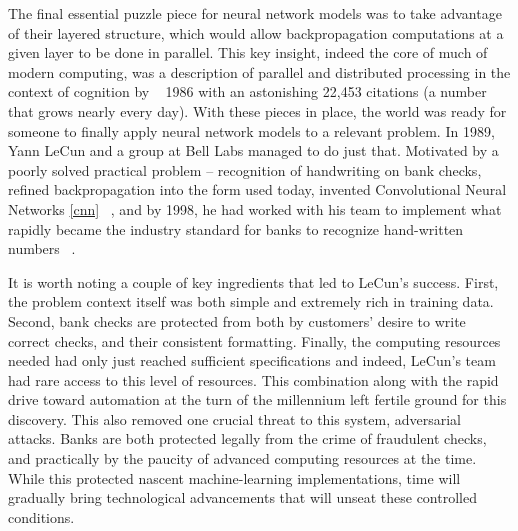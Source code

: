 The final essential puzzle piece for neural network models was to take
advantage of their layered structure, which would allow
backpropagation computations at a given layer to be done in
parallel. This key insight, indeed the core of much of modern
computing, was a description of parallel and distributed processing in
the context of cognition by 
~\citet{mcclelland1986parallel} 1986 with an astonishing 22,453 citations (a
number that grows nearly every day). With these pieces in place, the
world was ready for someone to finally apply neural network models to
a relevant problem. In 1989, Yann LeCun and a group at Bell Labs
managed to do just that. Motivated by a poorly solved practical
problem -- recognition of handwriting on bank checks,
~\citet{lecun1989backpropagation} refined backpropagation into the
form used today, invented Convolutional Neural Networks \ref{cnn}
~\citep{lecun1995convolutional}, and by  1998, he had worked with his
team to implement what rapidly became the industry standard for banks
to recognize hand-written numbers ~\citep{lecun1998gradient}.

It is worth noting a couple of key ingredients that led to LeCun's
success. First, the problem context itself was both simple and
extremely rich in training data. Second, bank checks are protected from
both by customers' desire to write correct checks, and their
consistent formatting. Finally, the computing resources needed had only just
reached sufficient specifications and indeed, LeCun's team had rare
access to this level of resources. This combination along with the
rapid drive toward automation at the turn of the millennium left
fertile ground for this discovery. This also removed one crucial
threat to this system, adversarial attacks. Banks are both protected
legally from the crime of fraudulent checks, and practically by the
paucity of advanced computing resources at the time. While this
protected nascent machine-learning implementations, time will
gradually bring technological advancements that will unseat these
controlled conditions. 

